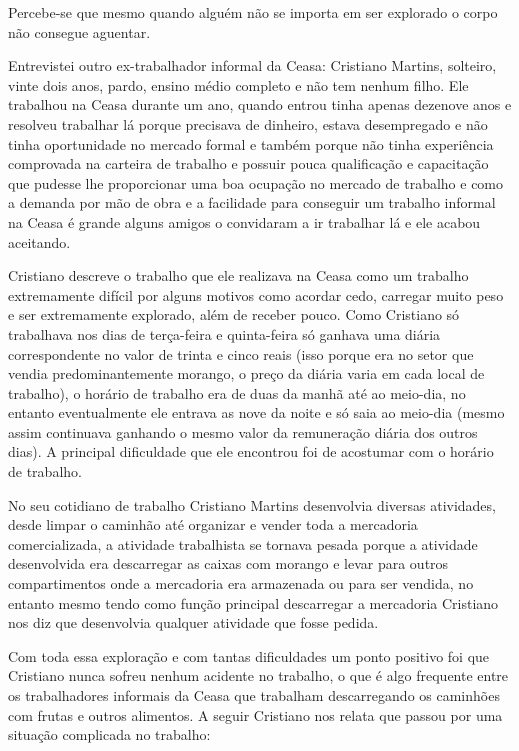 Percebe-se que mesmo quando alguém não se importa em ser explorado o corpo não consegue aguentar.

Entrevistei outro ex-trabalhador informal da Ceasa: Cristiano Martins, solteiro, vinte dois anos, pardo, ensino médio completo e não tem nenhum filho. Ele trabalhou na Ceasa durante um ano, quando entrou tinha apenas dezenove anos e resolveu trabalhar lá porque precisava de dinheiro, estava desempregado e não tinha oportunidade no mercado formal e também porque não tinha experiência comprovada na carteira de trabalho e possuir pouca qualificação e capacitação que pudesse lhe proporcionar uma boa ocupação no mercado de trabalho e como a demanda por mão de obra e a facilidade para conseguir um trabalho informal na Ceasa é grande alguns amigos o convidaram a ir trabalhar lá e ele acabou aceitando.

Cristiano descreve o trabalho que ele realizava na Ceasa como um trabalho extremamente difícil por alguns motivos como acordar cedo, carregar muito peso e ser extremamente explorado, além de receber pouco. Como Cristiano só trabalhava nos dias de terça-feira e quinta-feira só ganhava uma diária correspondente no valor de trinta e cinco reais (isso porque era no setor que vendia predominantemente morango, o preço da diária varia em cada local de trabalho), o horário de trabalho era de duas da manhã até ao meio-dia, no entanto eventualmente ele entrava as nove da noite e só saia ao meio-dia (mesmo assim continuava ganhando o mesmo valor da remuneração diária dos outros dias). A principal dificuldade que ele encontrou foi de acostumar com o horário de trabalho.

No seu cotidiano de trabalho Cristiano Martins desenvolvia diversas atividades, desde limpar o caminhão até organizar e vender toda a mercadoria comercializada, a atividade trabalhista se tornava pesada porque a atividade desenvolvida era descarregar as caixas com morango e levar para outros compartimentos onde a mercadoria era armazenada ou para ser vendida, no entanto mesmo tendo como função principal descarregar a mercadoria Cristiano nos diz que desenvolvia qualquer atividade que fosse pedida.

Com toda essa exploração e com tantas dificuldades um ponto positivo foi que Cristiano nunca sofreu nenhum acidente no trabalho, o que é algo frequente entre os trabalhadores informais da Ceasa que trabalham descarregando os caminhões com frutas e outros alimentos. A seguir Cristiano nos relata que passou por uma situação complicada no trabalho:

